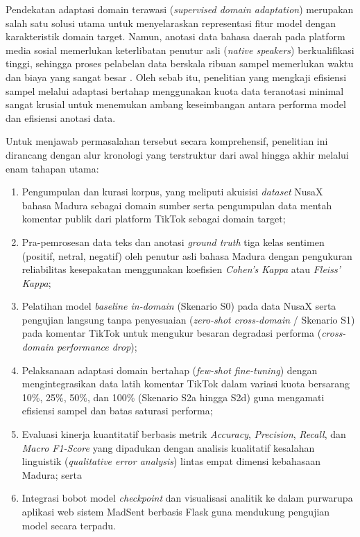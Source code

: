 Pendekatan adaptasi domain terawasi (\textit{supervised domain adaptation}) merupakan salah satu solusi utama untuk menyelaraskan representasi fitur model dengan karakteristik domain target. Namun, anotasi data bahasa daerah pada platform media sosial memerlukan keterlibatan penutur asli (\textit{native speakers}) berkualifikasi tinggi, sehingga proses pelabelan data berskala ribuan sampel memerlukan waktu dan biaya yang sangat besar \citep{aji2022one, cahyawijaya2023nusawrites}. Oleh sebab itu, penelitian yang mengkaji efisiensi sampel melalui adaptasi bertahap menggunakan kuota data teranotasi minimal sangat krusial untuk menemukan ambang keseimbangan antara performa model dan efisiensi anotasi data.

Untuk menjawab permasalahan tersebut secara komprehensif, penelitian ini dirancang dengan alur kronologi yang terstruktur dari awal hingga akhir melalui enam tahapan utama:
\begin{enumerate}
    \item Pengumpulan dan kurasi korpus, yang meliputi akuisisi \textit{dataset} NusaX bahasa Madura sebagai domain sumber serta pengumpulan data mentah komentar publik dari platform TikTok sebagai domain target;
    \item Pra-pemrosesan data teks dan anotasi \textit{ground truth} tiga kelas sentimen (positif, netral, negatif) oleh penutur asli bahasa Madura dengan pengukuran reliabilitas kesepakatan menggunakan koefisien \textit{Cohen's Kappa} atau \textit{Fleiss' Kappa};
    \item Pelatihan model \textit{baseline in-domain} (Skenario S0) pada data NusaX serta pengujian langsung tanpa penyesuaian (\textit{zero-shot cross-domain} / Skenario S1) pada komentar TikTok untuk mengukur besaran degradasi performa (\textit{cross-domain performance drop});
    \item Pelaksanaan adaptasi domain bertahap (\textit{few-shot fine-tuning}) dengan mengintegrasikan data latih komentar TikTok dalam variasi kuota bersarang 10\%, 25\%, 50\%, dan 100\% (Skenario S2a hingga S2d) guna mengamati efisiensi sampel dan batas saturasi performa;
    \item Evaluasi kinerja kuantitatif berbasis metrik \textit{Accuracy}, \textit{Precision}, \textit{Recall}, dan \textit{Macro F1-Score} yang dipadukan dengan analisis kualitatif kesalahan linguistik (\textit{qualitative error analysis}) lintas empat dimensi kebahasaan Madura; serta
    \item Integrasi bobot model \textit{checkpoint} dan visualisasi analitik ke dalam purwarupa aplikasi web sistem MadSent berbasis Flask guna mendukung pengujian model secara terpadu.
\end{enumerate}


